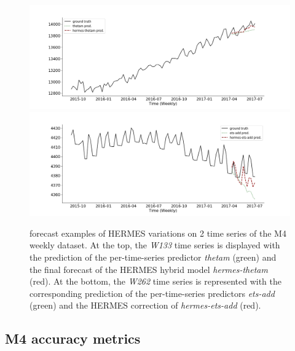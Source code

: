 \documentclass[review]{elsarticle}
\begin{document}
\begin{figure}
\centering
  \includegraphics[width=1.\linewidth]{w133_hermes_prediction.png}
  \includegraphics[width=1.\linewidth]{w262_hermes_prediction.png}
\caption{forecast examples of HERMES variations on 2 time series of the M4 weekly dataset. At the top, the \textit{W133} time series is displayed with the prediction of the per-time-series predictor \textit{thetam} (green) and the final forecast of the HERMES hybrid model \textit{hermes-thetam} (red). At the bottom, the \textit{W262} time series is represented with the corresponding prediction of the per-time-series predictors \textit{ets-add} (green) and the HERMES correction of \textit{hermes-ets-add} (red).} 
\label{fig:m4pred}
\end{figure}

\subsection{M4 accuracy metrics}
\label{sec:m4metric}
\end{document}
